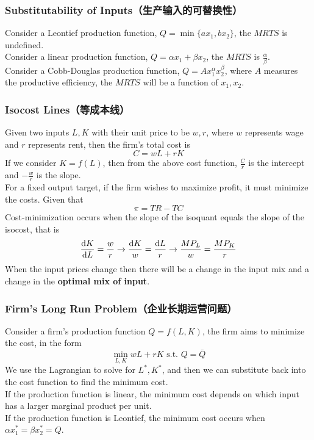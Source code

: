 \subsubsection{Substitutability of Inputs（生产输入的可替换性）}
Consider a Leontief production function, $Q = \min{\{ax_1, bx_2\}}$, the $MRTS$ is undefined. \\
Consider a linear production function, $Q = \alpha x_1 + \beta x_2$, the $MRTS$ is $\frac{\alpha}{\beta}$. \\
Consider a Cobb-Douglas production function, $Q = Ax_1^\alpha x_2^\beta$, where $A$ measures the productive efficiency, the $MRTS$ will be a function of $x_1, x_2$.

\subsubsection{Isocost Lines（等成本线）}
Given two inputs $L, K$ with their unit price to be $w, r$, where $w$ represents wage and $r$ represents rent, then the firm's total cost is
$$C = wL + rK$$
If we consider $K = f(L)$, then from the above cost function, $\frac{C}{r}$ is the intercept and $-\frac{w}{r}$ is the slope. \\
For a fixed output target, if the firm wishes to maximize profit, it must minimize the costs. Given that
$$\pi = TR - TC$$
Cost-minimization occurs when the slope of the isoquant equals the slope of the isocost, that is
$$\dv{K}{L} = \frac{w}{r} \to \frac{\dd K}{w} = \frac{\dd L}{r} \to \frac{MP_L}{w} = \frac{MP_K}{r}$$
When the input prices change then there will be a change in the input mix and a change in the \textbf{optimal mix of input}.

\subsubsection{Firm's Long Run Problem（企业长期运营问题）}
Consider a firm's production function $Q = f(L, K)$, the firm aims to minimize the cost, in the form
$$\min_{L,K} wL + rK \text{ s.t. } Q = \bar{Q}$$
We use the Lagrangian to solve for $L^{*}, K^{*}$, and then we can substitute back into the cost function to find the minimum cost. \\
If the production function is linear, the minimum cost depends on which input has a larger marginal product per unit. \\
If the production function is Leontief, the minimum cost occurs when $\alpha x_1^{*} = \beta x_2^{*} = Q$.

